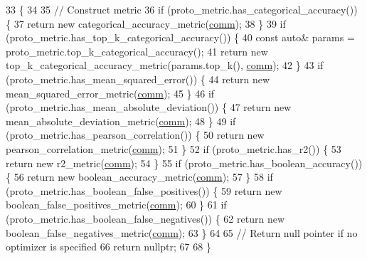 \begin{DoxyCode}
33                                                                \{
34 
35   \textcolor{comment}{// Construct metric}
36   \textcolor{keywordflow}{if} (proto\_metric.has\_categorical\_accuracy()) \{
37     \textcolor{keywordflow}{return} \textcolor{keyword}{new} categorical\_accuracy\_metric(\hyperlink{file__io_8cpp_ab048c6f9fcbcfaa57ce68b00263dbebe}{comm});
38   \}
39   \textcolor{keywordflow}{if} (proto\_metric.has\_top\_k\_categorical\_accuracy()) \{
40     \textcolor{keyword}{const} \textcolor{keyword}{auto}& params = proto\_metric.top\_k\_categorical\_accuracy();
41     \textcolor{keywordflow}{return} \textcolor{keyword}{new} top\_k\_categorical\_accuracy\_metric(params.top\_k(), \hyperlink{file__io_8cpp_ab048c6f9fcbcfaa57ce68b00263dbebe}{comm});
42   \}
43   \textcolor{keywordflow}{if} (proto\_metric.has\_mean\_squared\_error()) \{
44     \textcolor{keywordflow}{return} \textcolor{keyword}{new} mean\_squared\_error\_metric(\hyperlink{file__io_8cpp_ab048c6f9fcbcfaa57ce68b00263dbebe}{comm});
45   \}
46   \textcolor{keywordflow}{if} (proto\_metric.has\_mean\_absolute\_deviation()) \{
47     \textcolor{keywordflow}{return} \textcolor{keyword}{new} mean\_absolute\_deviation\_metric(\hyperlink{file__io_8cpp_ab048c6f9fcbcfaa57ce68b00263dbebe}{comm});
48   \}
49   \textcolor{keywordflow}{if} (proto\_metric.has\_pearson\_correlation()) \{
50     \textcolor{keywordflow}{return} \textcolor{keyword}{new} pearson\_correlation\_metric(\hyperlink{file__io_8cpp_ab048c6f9fcbcfaa57ce68b00263dbebe}{comm});
51   \}
52   \textcolor{keywordflow}{if} (proto\_metric.has\_r2()) \{
53     \textcolor{keywordflow}{return} \textcolor{keyword}{new} r2\_metric(\hyperlink{file__io_8cpp_ab048c6f9fcbcfaa57ce68b00263dbebe}{comm});
54   \}
55   \textcolor{keywordflow}{if} (proto\_metric.has\_boolean\_accuracy()) \{
56     \textcolor{keywordflow}{return} \textcolor{keyword}{new} boolean\_accuracy\_metric(\hyperlink{file__io_8cpp_ab048c6f9fcbcfaa57ce68b00263dbebe}{comm});
57   \}
58   \textcolor{keywordflow}{if} (proto\_metric.has\_boolean\_false\_positives()) \{
59     \textcolor{keywordflow}{return} \textcolor{keyword}{new} boolean\_false\_positives\_metric(\hyperlink{file__io_8cpp_ab048c6f9fcbcfaa57ce68b00263dbebe}{comm});
60   \}
61   \textcolor{keywordflow}{if} (proto\_metric.has\_boolean\_false\_negatives()) \{
62     \textcolor{keywordflow}{return} \textcolor{keyword}{new} boolean\_false\_negatives\_metric(\hyperlink{file__io_8cpp_ab048c6f9fcbcfaa57ce68b00263dbebe}{comm});
63   \}
64 
65   \textcolor{comment}{// Return null pointer if no optimizer is specified}
66   \textcolor{keywordflow}{return} \textcolor{keyword}{nullptr};
67 
68 \}
\end{DoxyCode}
